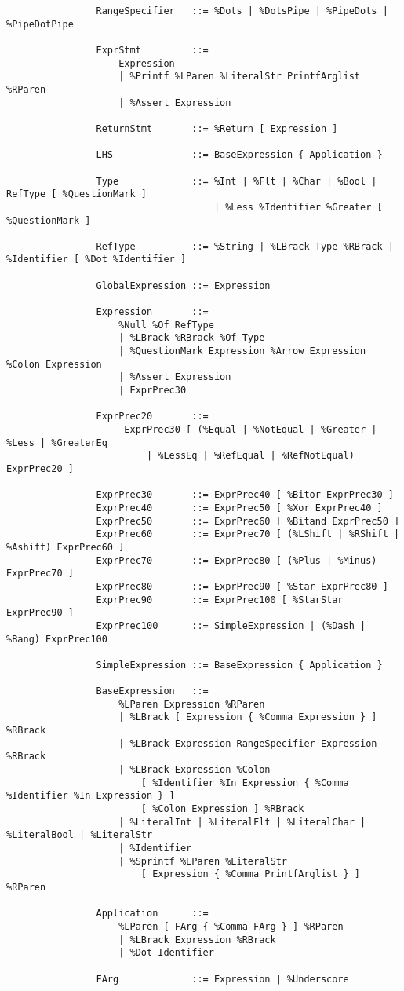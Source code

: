 \documentclass{article}
\begin{document}
\begin{small}
\begin{verbatim}
				RangeSpecifier   ::= %Dots | %DotsPipe | %PipeDots | %PipeDotPipe
				                 
				ExprStmt         ::=
				    Expression
				    | %Printf %LParen %LiteralStr PrintfArglist %RParen
				    | %Assert Expression
				                 
				ReturnStmt       ::= %Return [ Expression ]
				                 
				LHS              ::= BaseExpression { Application }
				                 
				Type             ::= %Int | %Flt | %Char | %Bool | RefType [ %QuestionMark ]
				                     | %Less %Identifier %Greater [ %QuestionMark ]
				                 
				RefType          ::= %String | %LBrack Type %RBrack | %Identifier [ %Dot %Identifier ]
				                 
				GlobalExpression ::= Expression
			
				Expression       ::=
				    %Null %Of RefType
				    | %LBrack %RBrack %Of Type
				    | %QuestionMark Expression %Arrow Expression %Colon Expression
 				    | %Assert Expression
				    | ExprPrec30
				
				ExprPrec20       ::=
				     ExprPrec30 [ (%Equal | %NotEqual | %Greater | %Less | %GreaterEq
				         | %LessEq | %RefEqual | %RefNotEqual) ExprPrec20 ]
				         
				ExprPrec30       ::= ExprPrec40 [ %Bitor ExprPrec30 ]
				ExprPrec40       ::= ExprPrec50 [ %Xor ExprPrec40 ]
				ExprPrec50       ::= ExprPrec60 [ %Bitand ExprPrec50 ]
				ExprPrec60       ::= ExprPrec70 [ (%LShift | %RShift | %Ashift) ExprPrec60 ]
				ExprPrec70       ::= ExprPrec80 [ (%Plus | %Minus) ExprPrec70 ]
				ExprPrec80       ::= ExprPrec90 [ %Star ExprPrec80 ]
				ExprPrec90       ::= ExprPrec100 [ %StarStar ExprPrec90 ]
				ExprPrec100      ::= SimpleExpression | (%Dash | %Bang) ExprPrec100
				                 
				SimpleExpression ::= BaseExpression { Application }
				
				BaseExpression   ::=
				    %LParen Expression %RParen
				    | %LBrack [ Expression { %Comma Expression } ] %RBrack
				    | %LBrack Expression RangeSpecifier Expression %RBrack
				    | %LBrack Expression %Colon
				        [ %Identifier %In Expression { %Comma %Identifier %In Expression } ]
				        [ %Colon Expression ] %RBrack
				    | %LiteralInt | %LiteralFlt | %LiteralChar | %LiteralBool | %LiteralStr
				    | %Identifier
				    | %Sprintf %LParen %LiteralStr
				        [ Expression { %Comma PrintfArglist } ] %RParen
				                 
				Application      ::=
				    %LParen [ FArg { %Comma FArg } ] %RParen
				    | %LBrack Expression %RBrack
				    | %Dot Identifier
				                 
				FArg             ::= Expression | %Underscore
			\end{verbatim}\end{small}
	
\end{document}
